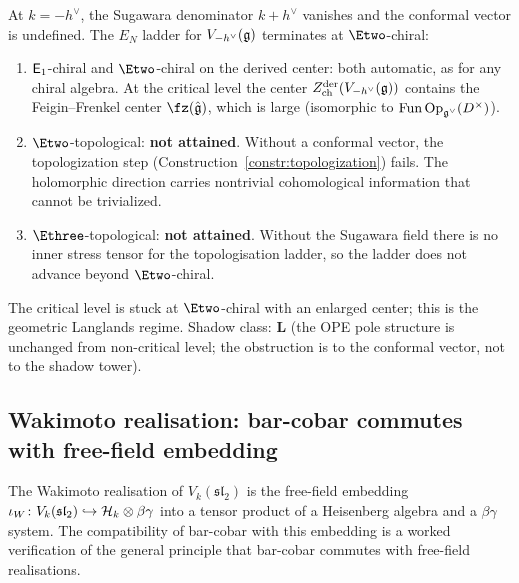 \begin{remark}[$E_N$ level at the critical level $k = -h^\vee$]
\label{rem:critical-level-EN}
At $k = -h^\vee$, the Sugawara denominator $k + h^\vee$
vanishes and the conformal vector is undefined. The
$E_N$ ladder for $V_{-h^\vee}(\mathfrak{g})$ terminates at
$\Etwo$-chiral:
\begin{enumerate}[label=\textup{(\roman*)}]
\item $\mathsf{E}_1$-chiral and $\Etwo$-chiral on the derived
 center: both automatic, as for any chiral algebra.
 At the critical level the center
 $Z^{\mathrm{der}}_{\mathrm{ch}}(V_{-h^\vee}(\mathfrak{g}))$
 contains the Feigin--Frenkel center $\fz(\hat\fg)$,
 which is large (isomorphic to
 $\operatorname{Fun}\operatorname{Op}_{\mathfrak{g}^\vee}(D^\times)$).

\item $\Etwo$-topological: \textbf{not attained}.
 Without a conformal vector, the topologization step
 (Construction~\ref{constr:topologization}) fails.
 The holomorphic direction carries nontrivial
 cohomological information that cannot be trivialized.

\item $\Ethree$-topological:
 \textbf{not attained}. Without the Sugawara field there is
 no inner stress tensor for the topologisation ladder, so
 the ladder does not advance beyond $\Etwo$-chiral.
\end{enumerate}
The critical level is stuck at $\Etwo$-chiral with an
enlarged center; this is the geometric Langlands regime. Shadow
class: $\mathbf{L}$ (the OPE pole structure is
unchanged from non-critical level; the obstruction is
to the conformal vector, not to the shadow tower).
\end{remark}

\subsection{Wakimoto realisation: bar-cobar commutes with free-field embedding}%
\label{subsec:wakimoto-ordered-bar}%
%

The Wakimoto realisation of $V_k(\mathfrak{sl}_2)$ is the
free-field embedding
$\iota_W \colon V_k(\mathfrak{sl}_2) \hookrightarrow
\mathcal{H}_k \otimes \beta\gamma$
into a tensor product of a Heisenberg algebra and a
$\beta\gamma$ system. The compatibility of bar-cobar with
this embedding is a worked verification of the general
principle that bar-cobar commutes with free-field realisations.

